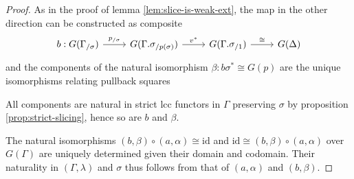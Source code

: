 \documentclass[a4paper]{article}
\theoremstyle{remark}
\theoremstyle{definition}
\begin{document}
\begin{proof}
  As in the proof of lemma \ref{lem:slice-is-weak-ext}, the map in the other direction can be constructed as composite
  \begin{equation}
    \begin{tikzcd}
      b : G(\Gamma_{/ \sigma}) \arrow[r, "p_{/ \sigma}"] & G(\Gamma.\sigma_{/ p(\sigma)}) \arrow[r, "v^*"] & G(\Gamma.\sigma_{/ 1}) \arrow[r, "\cong"] & G(\Delta)
    \end{tikzcd}
  \end{equation}
  and the components of the natural isomorphism $\beta : b \sigma^* \cong G(p)$ are the unique isomorphisms relating pullback squares
  All components are natural in strict lcc functors in $\Gamma$ preserving $\sigma$ by proposition \ref{prop:strict-slicing}, hence so are $b$ and $\beta$.

  The natural isomorphisms $(b, \beta) \circ (a, \alpha) \cong \mathrm{id}$ and $\mathrm{id} \cong (b, \beta) \circ (a, \alpha)$ over $G(\Gamma)$ are uniquely determined given their domain and codomain.
  Their naturality in $(\Gamma, \lambda)$ and $\sigma$ thus follows from that of $(a, \alpha)$ and $(b, \beta)$.
\end{proof}
\end{document}
